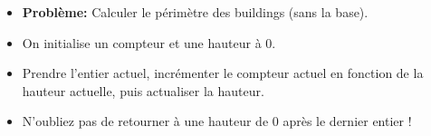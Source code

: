 
\begin{frame}
    \frametitle{\problemtitle}
    \begin{itemize}
        \item<+-> \textbf{Problème:} Calculer le périmètre des buildings (sans la base).
        \item<+-> On initialise un compteur et une hauteur à $0$.
        \item<+-> Prendre l'entier actuel, incrémenter le compteur actuel en fonction de la hauteur actuelle, puis actualiser la hauteur.
          \item<+-> N'oubliez pas de retourner à une hauteur de $0$ après le dernier entier !
    \end{itemize}
    \solvestats
\end{frame}